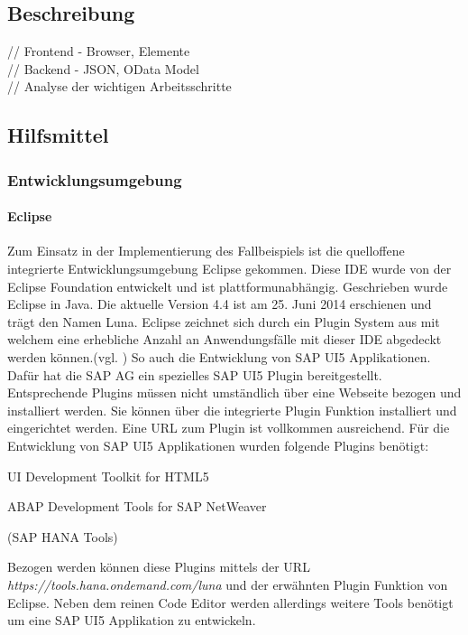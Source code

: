 \documentclass[12pt,a4paper,bibliography=totocnumbered,listof=totocnumbered]{scrartcl}
\begin{document}
\subsection{Beschreibung}
// Frontend - Browser, Elemente\\
// Backend - JSON, OData Model\\
// Analyse der wichtigen Arbeitsschritte\\

\subsection{Hilfsmittel}
\subsubsection{Entwicklungsumgebung}
\paragraph{Eclipse} Zum Einsatz in der Implementierung des Fallbeispiels ist die quelloffene integrierte Entwicklungsumgebung Eclipse gekommen. Diese \ac{IDE} wurde von der Eclipse Foundation entwickelt und ist plattformunabhängig. Geschrieben wurde Eclipse in Java. Die aktuelle Version 4.4 ist am 25. Juni 2014 erschienen und trägt den Namen Luna. Eclipse zeichnet sich durch ein Plugin System aus mit welchem eine erhebliche Anzahl an Anwendungsfälle mit dieser IDE abgedeckt werden können.(vgl. \cite{WikiEclipse2014}) So auch die Entwicklung von SAP UI5 Applikationen. Dafür hat die SAP AG ein spezielles SAP UI5 Plugin bereitgestellt. Entsprechende Plugins müssen nicht umständlich über eine Webseite bezogen und installiert werden. Sie können über die integrierte Plugin Funktion installiert und eingerichtet werden. Eine URL zum Plugin ist vollkommen ausreichend. Für die Entwicklung von SAP UI5 Applikationen wurden folgende Plugins benötigt:

    \begin{compactitem}
	    \item UI Development Toolkit for HTML5
	    \item ABAP Development Tools for SAP NetWeaver
	    \item (SAP HANA Tools)	    
    \end{compactitem}

Bezogen werden können diese Plugins mittels der URL \textit{https://tools.hana.ondemand.com/luna} und der erwähnten Plugin Funktion von Eclipse. Neben dem reinen Code Editor werden allerdings weitere Tools benötigt um eine SAP UI5 Applikation zu entwickeln.
\end{document}
